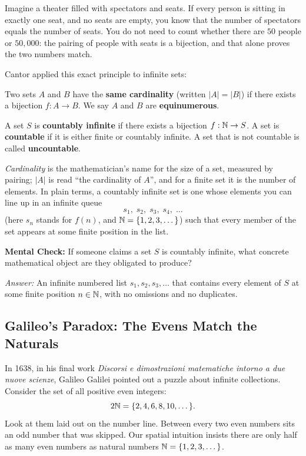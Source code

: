 Imagine a theater filled with spectators and seats. If every person is sitting in exactly one seat, and no seats are empty, you know that the number of spectators equals the number of seats. You do not need to count whether there are $50$ people or $50{,}000$: the pairing of people with seats is a bijection, and that alone proves the two numbers match.

Cantor applied this exact principle to infinite sets:

\begin{definition}
Two sets $A$ and $B$ have the \textbf{same cardinality} (written $|A| = |B|$) if there exists a bijection $f: A \to B$. We say $A$ and $B$ are \textbf{equinumerous}.

A set $S$ is \textbf{countably infinite} if there exists a bijection $f: \mathbb{N} \to S$. A set is \textbf{countable} if it is either finite or countably infinite. A set that is not countable is called \textbf{uncountable}.
\end{definition}

\emph{Cardinality} is the mathematician's name for the size of a set, measured by pairing; $|A|$ is read ``the cardinality of $A$'', and for a finite set it is the number of elements. In plain terms, a countably infinite set is one whose elements you can line up in an infinite queue
\[
s_1, \; s_2, \; s_3, \; s_4, \; \dots
\]
(here $s_n$ stands for $f(n)$, and $\mathbb{N} = \{1, 2, 3, \dots\}$) such that every member of the set appears at some finite position in the list.

\begin{recoverybox}
\textbf{Mental Check:} If someone claims a set $S$ is countably infinite, what concrete mathematical object are they obligated to produce?
\par\vspace{0.3em}
\emph{Answer:} An infinite numbered list $s_1, s_2, s_3, \dots$ that contains every element of $S$ at some finite position $n \in \mathbb{N}$, with no omissions and no duplicates.
\end{recoverybox}

\subsection{Galileo's Paradox: The Evens Match the Naturals}

In 1638, in his final work \emph{Discorsi e dimostrazioni matematiche intorno a due nuove scienze}, Galileo Galilei pointed out a puzzle about infinite collections. Consider the set of all positive even integers:
\[
2\mathbb{N} = \{2, 4, 6, 8, 10, \dots\}.
\]
Look at them laid out on the number line. Between every two even numbers sits an odd number that was skipped. Our spatial intuition insists there are only half as many even numbers as natural numbers $\mathbb{N} = \{1, 2, 3, \dots\}$.

